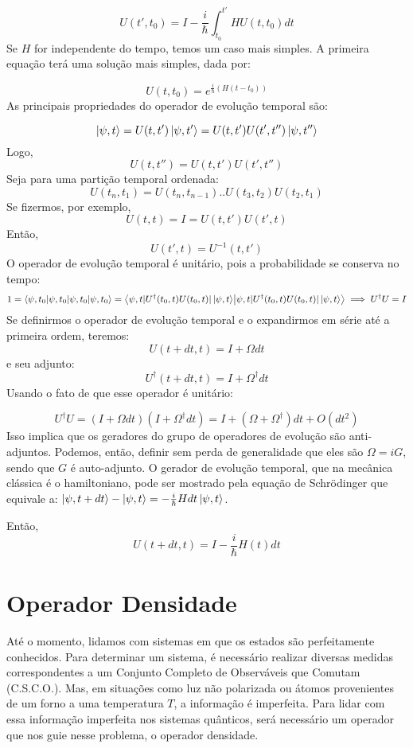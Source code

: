 \documentclass{article}
\begin{document}
	$$U(t',t_{0})=I-\frac{i}{\hbar}\int ^{t'}_{t_{0}}HU(t,t_{0})dt$$
	Se $H$ for independente do tempo, temos um caso mais simples. A primeira equação terá uma solução mais simples, dada por:
	
	$$U(t,t_{0})=e^{\frac{i}{\hbar}(H(t-t_{0}))}$$
	As principais propriedades do operador de evolução temporal são:
	
	$$\ket{\psi,t}=U(t,t') \ket{\psi,t'}=U(t,t')U(t',t'')\ket{\psi,t''}  $$
	Logo,
	$$U(t,t'')=U(t,t')U(t',t'') $$
	Seja para uma partição temporal ordenada:
	$$U(t_{n},t_{1})=U(t_{n},t_{n-1})..U(t_{3},t_{2})U(t_{2},t_{1}) $$
	Se fizermos, por exemplo,
	$$U(t,t)=I=U(t,t')U(t',t)$$
	Então,
	$$U(t',t)=U^{-1}(t,t')$$
	O operador de evolução temporal é unitário, pois a probabilidade se conserva no tempo:
	$$1=\braket{ \psi ,t_{0} | \psi,t_{0} }=\braket{ \psi,t |U^{\dagger}(t_{0},t)U(t_{0},t)|\ket{\psi,t}    } \implies U^{\dagger}U=I    $$
	Se definirmos o operador de evolução temporal e o expandirmos em série até a primeira ordem, teremos:
	$$U(t+dt,t)=I+\Omega dt  $$
	e seu adjunto:
	$$U^{\dagger}(t+dt,t)=I+\Omega ^{\dagger} dt$$
	Usando o fato de que esse operador é unitário:
	
	$$U^{\dagger}U=(I+\Omega dt)(I+\Omega ^{\dagger}dt)=I+(\Omega+\Omega ^{\dagger})dt+O(dt^{2})$$
	Isso implica que os geradores do grupo de operadores de evolução são anti-adjuntos. Podemos, então, definir sem perda de generalidade que eles são $\Omega =iG$, sendo que $G$ é auto-adjunto.
	O gerador de evolução temporal, que na mecânica clássica é o hamiltoniano, pode ser mostrado pela equação de Schrödinger que equivale a: $\ket{\psi,t+dt}-\ket{\psi,t}=-\frac{i}{\hbar}Hdt\ket{\psi,t}$.
	
	Então,
	$$U(t+dt,t)=I-\frac{i}{\hbar}H(t)dt$$
	
	\section{Operador Densidade}
	
	Até o momento, lidamos com sistemas em que os estados são perfeitamente conhecidos. Para determinar um sistema, é necessário realizar diversas medidas correspondentes a um Conjunto Completo de Observáveis que Comutam (C.S.C.O.). Mas, em situações como luz não polarizada ou átomos provenientes de um forno a uma temperatura $T$, a informação é imperfeita. Para lidar com essa informação imperfeita nos sistemas quânticos, será necessário um operador que nos guie nesse problema, o operador densidade.
	
\end{document}
